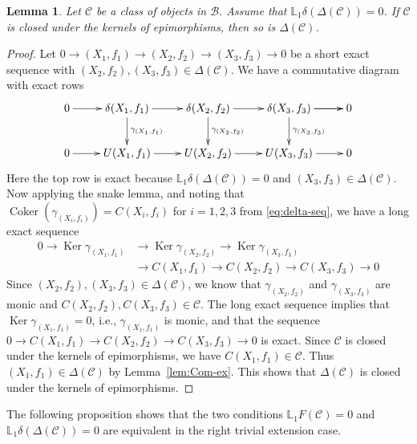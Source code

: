 \documentclass[11pt,reqno]{amsart}
\numberwithin{equation}{section}
\newtheorem{lemma}[theorem]{Lemma}
\newcommand{\cB}{\mathcal B}
\newcommand{\cC}{\mathcal C}
\newcommand{\Coker}{\operatorname{Coker}}
\newcommand{\Ker}{\operatorname{Ker}}
\begin{document}
\begin{lemma}\label{lem:ker-epi}
Let $\cC$ be a class of objects in $\cB$. Assume that $\mathbb{L}_1\delta(\Delta(\cC))=0$. If $\cC$ is closed under the kernels of epimorphisms, then so is $\Delta(\cC)$.
\end{lemma}
\begin{proof}
Let $0\rightarrow (X_1,f_1)\rightarrow (X_2,f_2)\rightarrow (X_3,f_3)\rightarrow 0$ be a short exact sequence with $(X_2,f_2), (X_3,f_3)\in \Delta(\cC)$.
We have a commutative diagram with exact rows
\[
\xymatrix{
0\ar[r] & \delta(X_1,f_1) \ar[r] \ar[d]^{\gamma_{(X_1,f_1)}} & \delta(X_2,f_2) \ar[r] \ar[d]^{\gamma_{(X_2,f_2)}} & \delta(X_3,f_3) \ar[r] \ar[d]^{\gamma_{(X_3,f_3)}} \ar[r] & 0\\
0\ar[r] & U(X_1,f_1) \ar[r] & U(X_2,f_2) \ar[r] & U(X_3,f_3) \ar[r]  & 0
}
\]
Here the top row is exact because $\mathbb{L}_1\delta(\Delta(\cC))=0$ and $(X_3,f_3)\in \Delta(\cC)$. Now applying the snake lemma, and noting that $\Coker(\gamma_{(X_i,f_i)})=C(X_i,f_i)$ for $i=1,2,3$ from \eqref{eq:delta-seq}, we have a long exact sequence
\[
\begin{aligned}
0\to\Ker\gamma_{(X_1,f_1)}&\to \Ker\gamma_{(X_2,f_2)} \to \Ker\gamma_{(X_3,f_3)} \\
&\to C(X_1,f_1) \to C(X_2,f_2) \to C(X_3,f_3) \to 0
\end{aligned}
\]
Since $(X_2,f_2), (X_3,f_3)\in \Delta(\cC)$, we know that $\gamma_{(X_2,f_2)}$ and $\gamma_{(X_3,f_3)}$ are monic and
$C(X_2,f_2),C(X_3,f_3)\in \cC$. The long exact sequence implies that
$\Ker\gamma_{(X_1,f_1)}=0$, i.e., $\gamma_{(X_1,f_1)}$ is monic,
and that the sequence $0\to C(X_1,f_1) \to C(X_2,f_2) \to C(X_3,f_3) \to 0$ is exact. Since $\cC$ is closed under the kernels of epimorphisms,
we have $C(X_1,f_1)\in \cC$.
Thus $(X_1,f_1)\in \Delta(\cC)$ by Lemma~\ref{lem:Com-ex}. This shows that $\Delta(\cC)$ is closed under  the kernels of epimorphisms.
\end{proof}

The following proposition shows that the two conditions $\mathbb{L}_1F(\cC)=0$ and $\mathbb{L}_1\delta(\Delta(\cC))=0$ are equivalent in the right trivial extension case.
\end{document}
